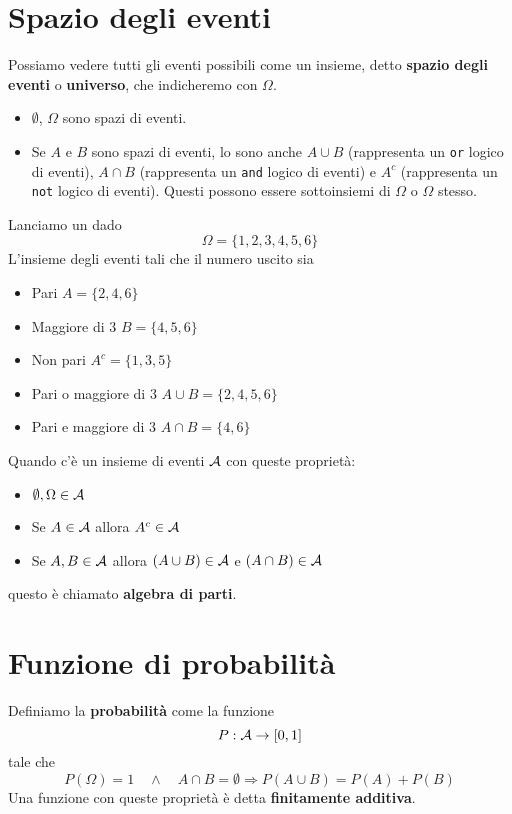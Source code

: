 \section{Spazio degli eventi}
Possiamo vedere tutti gli eventi possibili come un insieme, detto \textbf{spazio degli eventi} o
\textbf{universo}, che indicheremo con $\Omega$.
\begin{itemize}
	\item $\emptyset$, $\Omega$ sono spazi di eventi.
	\item Se $A$ e $B$ sono spazi di eventi, lo sono anche $A \cup B$ (rappresenta un \verb|or| logico di
	      eventi), $A \cap B$ (rappresenta un \verb|and| logico di eventi) e $A^c$ (rappresenta un
	      \verb|not| logico di eventi). Questi possono essere sottoinsiemi di $\Omega$ o $\Omega$ stesso.
\end{itemize}

\begin{example}
	Lanciamo un dado
	\[ \Omega = \{ 1, 2, 3, 4, 5, 6 \} \]
	L'insieme degli eventi tali che il numero uscito sia
	\begin{itemize}
		\item Pari $A = \{ 2, 4, 6 \}$
		\item Maggiore di 3 $B = \{ 4, 5, 6 \}$
		\item Non pari $A^c = \{ 1, 3, 5 \}$
		\item Pari o maggiore di 3 $A \cup B = \{ 2, 4, 5, 6 \}$
		\item Pari e maggiore di 3 $A \cap B = \{ 4, 6 \}$
	\end{itemize}
\end{example}

\begin{definition}
	Quando c'è un insieme di eventi $\mathcal{A}$ con queste proprietà:
	\begin{itemize}
		\item $\emptyset, \Omega \in \mathcal{A}$
		\item Se $A \in \mathcal{A}$ allora $A^c \in \mathcal{A}$
		\item Se $A, B \in \mathcal{A}$ allora $(A \cup B) \in \mathcal{A}$ e $(A \cap B) \in \mathcal{A}$
	\end{itemize}
	questo è chiamato \textbf{algebra di parti}.
\end{definition}

\section{Funzione di probabilità}
\begin{definition}[Provvisoria]
	Definiamo la \textbf{probabilità} come la funzione
	\[ P : \mathcal{A} \to [0, 1] \]
	tale che
	\[
		P (\Omega) = 1 \quad \land \quad
		A \cap B = \emptyset \Rightarrow P(A \cup B) = P(A) + P(B)
	\]
	Una funzione con queste proprietà è detta \textbf{finitamente additiva}.
\end{definition}

